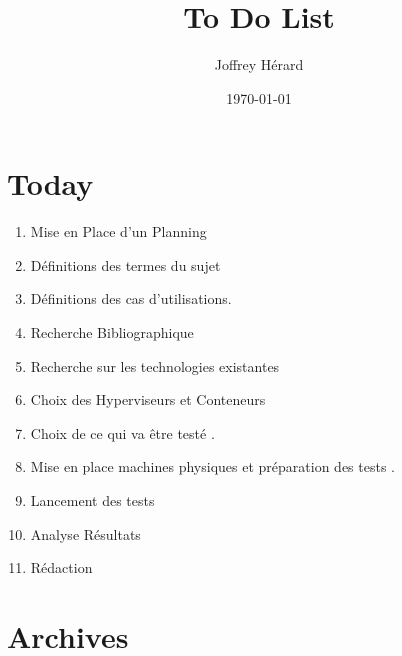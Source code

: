 \documentclass[french]{article}
\begin{document}
\title{To Do List}
\author{Joffrey Hérard}
\date{\today} 
\maketitle
\section{Today}
\begin{enumerate}
\item Mise en Place d'un Planning
\item Définitions des termes du sujet
\item Définitions des cas d'utilisations.
\item Recherche Bibliographique 
\item Recherche sur les technologies existantes
\item Choix des Hyperviseurs et Conteneurs
\item Choix de ce qui va être testé . 
\item Mise en place machines physiques et préparation des tests .
\item Lancement des tests
\item Analyse Résultats
\item Rédaction
\end{enumerate}
\newpage
\section{Archives}
\end{document}
